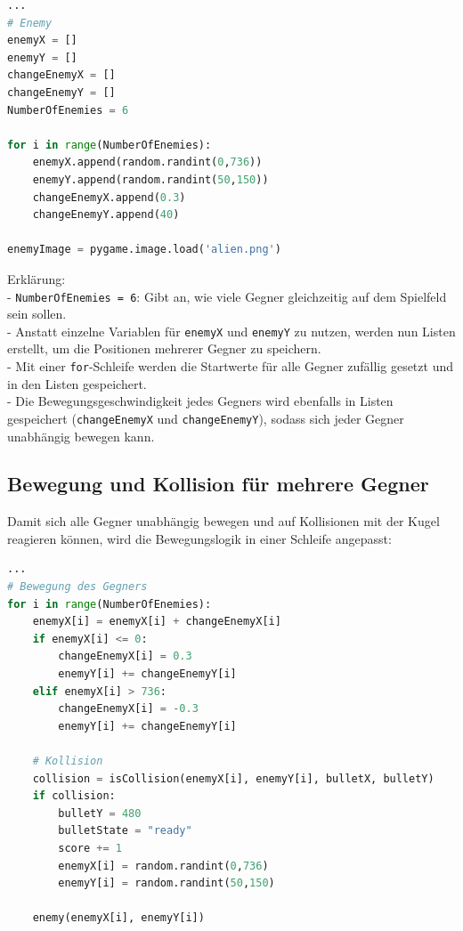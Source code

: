 \documentclass{article}
\begin{document}
\begin{lstlisting}[style=pythonstyle, language=Python]
...
# Enemy
enemyX = []
enemyY = []
changeEnemyX = []
changeEnemyY = []
NumberOfEnemies = 6

for i in range(NumberOfEnemies):
    enemyX.append(random.randint(0,736))
    enemyY.append(random.randint(50,150))
    changeEnemyX.append(0.3)
    changeEnemyY.append(40)

enemyImage = pygame.image.load('alien.png')
\end{lstlisting}

Erklärung:\\
- \texttt{NumberOfEnemies = 6}: Gibt an, wie viele Gegner gleichzeitig auf dem Spielfeld sein sollen.\\
- Anstatt einzelne Variablen für \texttt{enemyX} und \texttt{enemyY} zu nutzen, werden nun Listen erstellt, um die Positionen mehrerer Gegner zu speichern.\\
- Mit einer \texttt{for}-Schleife werden die Startwerte für alle Gegner zufällig gesetzt und in den Listen gespeichert.\\
- Die Bewegungsgeschwindigkeit jedes Gegners wird ebenfalls in Listen gespeichert (\texttt{changeEnemyX} und \texttt{changeEnemyY}), sodass sich jeder Gegner unabhängig bewegen kann.\\

\subsection{Bewegung und Kollision für mehrere Gegner}
Damit sich alle Gegner unabhängig bewegen und auf Kollisionen mit der Kugel reagieren können, wird die Bewegungslogik in einer Schleife angepasst:

\begin{lstlisting}[style=pythonstyle, language=Python]
...
# Bewegung des Gegners
for i in range(NumberOfEnemies):
    enemyX[i] = enemyX[i] + changeEnemyX[i]
    if enemyX[i] <= 0:
        changeEnemyX[i] = 0.3
        enemyY[i] += changeEnemyY[i]
    elif enemyX[i] > 736:
        changeEnemyX[i] = -0.3
        enemyY[i] += changeEnemyY[i]

    # Kollision
    collision = isCollision(enemyX[i], enemyY[i], bulletX, bulletY)
    if collision:
        bulletY = 480
        bulletState = "ready"
        score += 1
        enemyX[i] = random.randint(0,736)
        enemyY[i] = random.randint(50,150)

    enemy(enemyX[i], enemyY[i])
\end{lstlisting}
\end{document}
